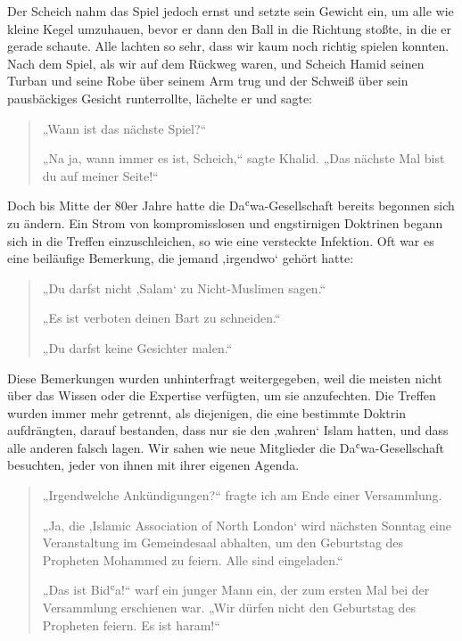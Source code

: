 \documentclass[12pt]{memoir}
\def\`{ʿ} %
\def\–{\hskip0pt-\hskip0pt}
\begin{document}
Der Scheich nahm das Spiel jedoch ernst
und setzte sein Gewicht ein, um alle wie kleine Kegel umzuhauen,
bevor er dann den Ball in die Richtung stoßte, in die er gerade schaute.
Alle lachten so sehr, dass wir kaum noch richtig spielen konnten.
Nach dem Spiel, als wir auf dem Rückweg waren,
und Scheich Hamid seinen Turban
und seine Robe über seinem Arm trug und der Schweiß
über sein pausbäckiges Gesicht runterrollte,
lächelte er und sagte:

\begin{quote}
„Wann ist das nächste Spiel?“

„Na ja, wann immer es ist, Scheich,“ sagte Khalid.
„Das nächste Mal bist du auf meiner Seite!“
\end{quote}

Doch bis Mitte der 80er Jahre hatte die Da\`wa\–Gesellschaft
bereits begonnen sich zu ändern.
Ein Strom von kompromisslosen und engstirnigen Doktrinen
begann sich in die Treffen einzuschleichen,
so wie eine versteckte Infektion.
Oft war es eine beiläufige Bemerkung, die jemand ‚irgendwo‘ gehört hatte:

\begin{quote}
„Du darfst nicht ‚Salam‘ zu Nicht\–Muslimen sagen.“

„Es ist verboten deinen Bart zu schneiden.“

„Du darfst keine Gesichter malen.“
\end{quote}

Diese Bemerkungen wurden unhinterfragt weitergegeben,
weil die meisten nicht über das Wissen oder die Expertise verfügten,
um sie anzufechten.
Die Treffen wurden immer mehr getrennt, als diejenigen,
die eine bestimmte Doktrin aufdrängten, darauf bestanden,
dass nur sie den ‚wahren‘ Islam hatten,
und dass alle anderen falsch lagen.
Wir sahen wie neue Mitglieder die Da\`wa\–Gesellschaft besuchten,
jeder von ihnen mit ihrer eigenen Agenda.

\begin{quote}
„Irgendwelche Ankündigungen?“ fragte ich am Ende einer Versammlung.

„Ja, die ‚Islamic Association of North London‘ wird nächsten Sonntag
eine Veranstaltung im Gemeindesaal abhalten,
um den Geburtstag des Propheten Mohammed zu feiern.
Alle sind eingeladen.“

„Das ist Bid\`a!“ warf ein junger Mann ein,
der zum ersten Mal bei der Versammlung erschienen war.
„Wir dürfen nicht den Geburtstag des Propheten feiern. Es ist haram!“
\end{quote}
\end{document}
